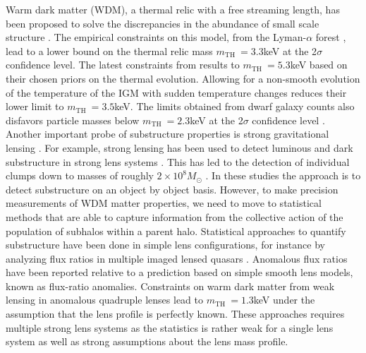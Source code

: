 \documentclass[a4paper,11pt]{article}
\def \mth {\ensuremath{m_{\text{TH}}}~}
\begin{document}
Warm dark matter (WDM), a thermal relic with a free streaming length, has been proposed to solve the discrepancies in the abundance of small scale structure \citep[][]{Bode:2001p13951, Abazajian:2006p13972}. 
The empirical constraints on this model, from the Lyman-$\alpha$ forest \citep[][]{Viel:2013p13930}, lead to a lower bound on the thermal relic mass $\mth = 3.3$keV at the 2$\sigma$ confidence level. The latest constraints from \cite{Irsic:2017p15429} results to $\mth = 5.3$keV based on their chosen priors on the thermal evolution. Allowing for a non-smooth evolution of the temperature of the IGM with sudden temperature changes reduces their lower limit to $\mth = 3.5$keV. The limits obtained from dwarf galaxy counts also disfavors particle masses below $\mth = 2.3$keV at the 2$\sigma$ confidence level \citep[][]{Polisensky:2011p14007, Kennedy:2014p14040}. Another important probe of substructure properties is strong gravitational lensing \citep[][]{Metcalf:2001p9744, Keeton:2009p9737, Moustakas:2009p9694}. For example, strong lensing has been used to detect luminous and dark substructure in strong lens systems \citep[][]{Koopmans:2005p8841, Vegetti:2009p9255}. This has led to the detection of individual clumps down to masses of roughly $2 \times 10^8 M_{\odot}$ \citep[][]{Vegetti:2010p9515, Vegetti:2012p4937, Hezaveh:2016p13593}. In these studies the approach is to detect substructure on an object by object basis. However, to make precision measurements of WDM matter properties, we need to move to statistical methods that are able to capture information from the collective action of the population of subhalos within a parent halo. Statistical approaches to quantify substructure have been done in simple lens configurations, for instance by analyzing flux ratios in multiple imaged lensed quasars \citep[see e.g.,][]{Metcalf:2002p9547, Amara:2006p4715, Metcalf:2012p5467, Xu:2015p9516, Nierenberg:2017p15476}. Anomalous flux ratios have been reported relative to a prediction based on simple smooth lens models, known as flux-ratio anomalies. Constraints on warm dark matter from weak lensing in anomalous quadruple lenses \citep[][]{Inoue:2015p15467} lead to $\mth = 1.3$keV under the assumption that the lens profile is perfectly known. These approaches requires multiple strong lens systems as the statistics is rather weak for a single lens system as well as strong assumptions about the lens mass profile.
\end{document}
